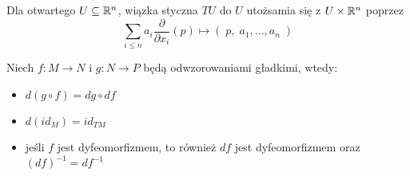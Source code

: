 \begin{example}
\item Dla otwartego $U\subseteq\mathbb{R}^n$, wiązka styczna $TU$ do $U$ utożsamia się z $U\times\mathbb{R}^n$ poprzez
  $$\sum_{i\leq n}a_i\frac{\partial}{\partial x_i}(p)\mapsto (\;p,\;a_1,...,a_n\;)$$
\end{example}

  Niech $f:M\to N$ i $g:N\to P$ będą odwzorowaniami gładkimi, wtedy:
  \begin{itemize}
    \item $d(g\circ f)=dg\circ df$
    \item $d(id_M)=id_{TM}$
    \item jeśli $f$ jest dyfeomorfizmem, to również $df$ jest dyfeomorfizmem oraz $(df)^{-1}=df^{-1}$
  \end{itemize}
